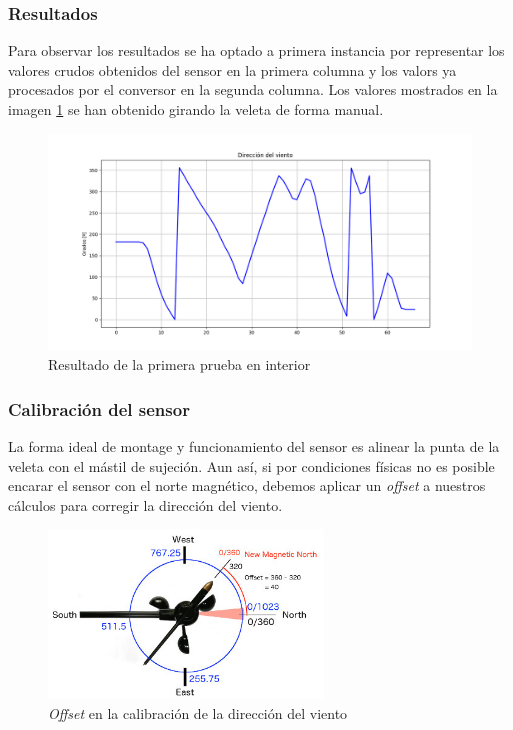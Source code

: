 \documentclass[a4paper, 11pt]{article}
\begin{document}
\subsubsection{Resultados}
Para observar los resultados se ha optado a primera instancia por representar los valores crudos obtenidos del sensor en la primera columna y los valors ya procesados por el conversor en la segunda columna. Los valores mostrados en la imagen \ref{fig:testdirection1} se han obtenido girando la veleta de forma manual.

\begin{figure}[h]
	\center
	\includegraphics[width=1\textwidth]{img/testDirectionIn.png}
	\caption{Resultado de la primera prueba en interior}
	\label{fig:testdirection1}
\end{figure}

\subsubsection{Calibración del sensor}
La forma ideal de montage y funcionamiento del sensor es alinear la punta de la veleta con el mástil de sujeción. Aun así, si por condiciones físicas no es posible encarar el sensor con el norte magnético, debemos aplicar un \textit{offset} a nuestros cálculos para corregir la dirección del viento.

\begin{figure}[h]
	\center
	\includegraphics[width=0.65\textwidth]{img/offset.jpg}
	\caption{\textit{Offset} en la calibración de la dirección del viento}
	\label{fig:offset}
\end{figure}
\end{document}
